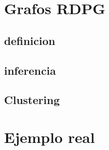 \documentclass{article}
\begin{document}
\section{Grafos RDPG}

\subsection{definicion}

\subsection{inferencia}

\subsection{Clustering }

\section{Ejemplo real}

\FloatBarrier


\end{document}
